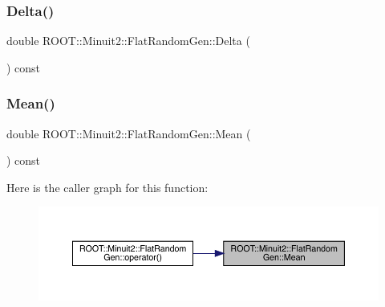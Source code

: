 \subsubsection{\texorpdfstring{Delta()}{Delta()}\hspace{0.1cm}{\footnotesize\ttfamily [2/2]}}
{\footnotesize\ttfamily double R\+O\+O\+T\+::\+Minuit2\+::\+Flat\+Random\+Gen\+::\+Delta (\begin{DoxyParamCaption}{ }\end{DoxyParamCaption}) const\hspace{0.3cm}{\ttfamily [inline]}}

\mbox{\label{classROOT_1_1Minuit2_1_1FlatRandomGen_ab934b4a66f13eaaf30c9a9280c7ddb10}} 
\subsubsection{\texorpdfstring{Mean()}{Mean()}\hspace{0.1cm}{\footnotesize\ttfamily [1/2]}}
{\footnotesize\ttfamily double R\+O\+O\+T\+::\+Minuit2\+::\+Flat\+Random\+Gen\+::\+Mean (\begin{DoxyParamCaption}{ }\end{DoxyParamCaption}) const\hspace{0.3cm}{\ttfamily [inline]}}

Here is the caller graph for this function\+:
\nopagebreak
\begin{figure}[H]
\begin{center}
\leavevmode
\includegraphics[width=350pt]{dc/d91/classROOT_1_1Minuit2_1_1FlatRandomGen_ab934b4a66f13eaaf30c9a9280c7ddb10_icgraph}
\end{center}
\end{figure}
\mbox{\label{classROOT_1_1Minuit2_1_1FlatRandomGen_ab934b4a66f13eaaf30c9a9280c7ddb10}} 
